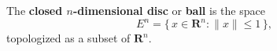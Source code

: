 The \textbf{closed $n$-dimensional disc} or \textbf{ball} is the space
$$
E^n = \{\, x \in \mathbf{R}^n : \|x\| \leq 1 \,\},
$$
topologized as a subset of $\mathbf{R}^n$.
